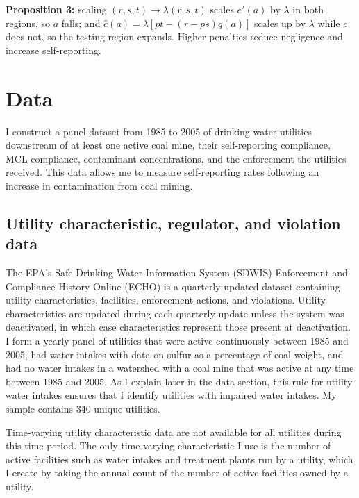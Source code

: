 \documentclass{article}
\begin{document}
\textbf{Proposition 3:} scaling $(r,s,t) \to \lambda(r,s,t)$ scales $e'(a)$ by $\lambda$ in both regions, so $a$ falls; and $\hat{c}(a) = \lambda\left[pt - (r-ps)q(a)\right]$ scales up by $\lambda$ while $c$ does not, so the testing region expands. Higher penalties reduce negligence and increase self-reporting.

\section{Data}

I construct a panel dataset from 1985 to 2005 of drinking water utilities downstream of at least one active coal mine, their self-reporting compliance, MCL compliance, contaminant concentrations, and the enforcement the utilities received. This data allows me to measure self-reporting rates following an increase in contamination from coal mining.

\subsection{Utility characteristic, regulator, and violation data}

The EPA's Safe Drinking Water Information System (SDWIS) Enforcement and Compliance History Online (ECHO) is a quarterly updated dataset containing utility characteristics, facilities, enforcement actions, and violations. Utility characteristics are updated during each quarterly update unless the system was deactivated, in which case characteristics represent those present at deactivation. I form a yearly panel of utilities that were active continuously between 1985 and 2005, had water intakes with data on sulfur as a percentage of coal weight, and had no water intakes in a watershed with a coal mine that was active at any time between 1985 and 2005. As I explain later in the data section, this rule for utility water intakes ensures that I identify utilities with impaired water intakes. My sample contains 340 unique utilities. 

Time-varying utility characteristic data are not available for all utilities during this time period. The only time-varying characteristic I use is the number of active facilities such as water intakes and treatment plants run by a utility, which I create by taking the annual count of the number of active facilities owned by a utility. 
\end{document}
